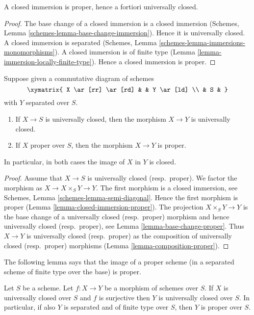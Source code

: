 \begin{lemma}
\label{lemma-closed-immersion-proper}
A closed immersion is proper, hence a fortiori universally closed.
\end{lemma}

\begin{proof}
The base change of a closed immersion is a closed immersion
(Schemes, Lemma \ref{schemes-lemma-base-change-immersion}).
Hence it is universally closed.
A closed immersion is separated
(Schemes, Lemma \ref{schemes-lemma-immersions-monomorphisms}).
A closed immersion is of finite type
(Lemma \ref{lemma-immersion-locally-finite-type}).
Hence a closed immersion is proper.
\end{proof}

\begin{lemma}
\label{lemma-image-proper-scheme-closed}
Suppose given a commutative diagram of schemes
$$
\xymatrix{
X \ar[rr] \ar[rd] & &
Y \ar[ld] \\
& S &
}
$$
with $Y$ separated over $S$.
\begin{enumerate}
\item If $X \to S$ is universally closed, then the morphism
$X \to Y$ is universally closed.
\item If $X$ proper over $S$, then the morphism $X \to Y$ is proper.
\end{enumerate}
In particular, in both cases the image of $X$ in $Y$ is closed.
\end{lemma}

\begin{proof}
Assume that $X \to S$ is universally closed (resp.\ proper).
We factor the morphism as $X \to X \times_S Y \to Y$.
The first morphism is a closed immersion, see
Schemes, Lemma \ref{schemes-lemma-semi-diagonal}.
Hence the first morphism is proper (Lemma \ref{lemma-closed-immersion-proper}).
The projection $X \times_S Y \to Y$ is the base change
of a universally closed (resp.\ proper) morphism and hence
universally closed (resp.\ proper), see Lemma \ref{lemma-base-change-proper}.
Thus $X \to Y$ is universally closed (resp.\ proper) as the composition
of universally closed (resp.\ proper) morphisms
(Lemma \ref{lemma-composition-proper}).
\end{proof}

\noindent
The following lemma says that the image of a proper scheme (in a separated
scheme of finite type over the base) is proper.

\begin{lemma}
\label{lemma-image-proper-is-proper}
Let $S$ be a scheme.
Let $f : X \to Y$ be a morphism of schemes over $S$.
If $X$ is universally closed over $S$ and $f$ is surjective then
$Y$ is universally closed over $S$. In particular, if also $Y$ is
separated and of finite type over $S$, then $Y$ is proper over $S$.
\end{lemma}

